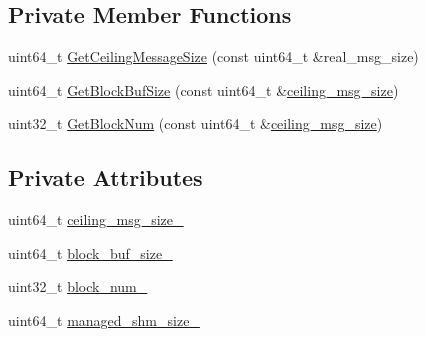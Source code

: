\subsection*{Private Member Functions}
\begin{DoxyCompactItemize}
\item 
uint64\-\_\-t \hyperlink{classapollo_1_1cyber_1_1transport_1_1ShmConf_a815d00d835e8264d39ec94ef8c17eb22}{Get\-Ceiling\-Message\-Size} (const uint64\-\_\-t \&real\-\_\-msg\-\_\-size)
\item 
uint64\-\_\-t \hyperlink{classapollo_1_1cyber_1_1transport_1_1ShmConf_a2419fada7af195020c4cb10e3c53903a}{Get\-Block\-Buf\-Size} (const uint64\-\_\-t \&\hyperlink{classapollo_1_1cyber_1_1transport_1_1ShmConf_a0638b67663e292b37319c3d3d47e7530}{ceiling\-\_\-msg\-\_\-size})
\item 
uint32\-\_\-t \hyperlink{classapollo_1_1cyber_1_1transport_1_1ShmConf_ad53e47c8e3c1621c3ad01ac8f40a35e0}{Get\-Block\-Num} (const uint64\-\_\-t \&\hyperlink{classapollo_1_1cyber_1_1transport_1_1ShmConf_a0638b67663e292b37319c3d3d47e7530}{ceiling\-\_\-msg\-\_\-size})
\end{DoxyCompactItemize}
\subsection*{Private Attributes}
\begin{DoxyCompactItemize}
\item 
uint64\-\_\-t \hyperlink{classapollo_1_1cyber_1_1transport_1_1ShmConf_a430271f7c44dcb406fd216d44da12a59}{ceiling\-\_\-msg\-\_\-size\-\_\-}
\item 
uint64\-\_\-t \hyperlink{classapollo_1_1cyber_1_1transport_1_1ShmConf_a509aaf3daed9df450bcb7191f1036d2d}{block\-\_\-buf\-\_\-size\-\_\-}
\item 
uint32\-\_\-t \hyperlink{classapollo_1_1cyber_1_1transport_1_1ShmConf_a509436e708979c6c0f4e34de92da9978}{block\-\_\-num\-\_\-}
\item 
uint64\-\_\-t \hyperlink{classapollo_1_1cyber_1_1transport_1_1ShmConf_ae5908420a4245600ff69635e3375addb}{managed\-\_\-shm\-\_\-size\-\_\-}
\end{DoxyCompactItemize}
